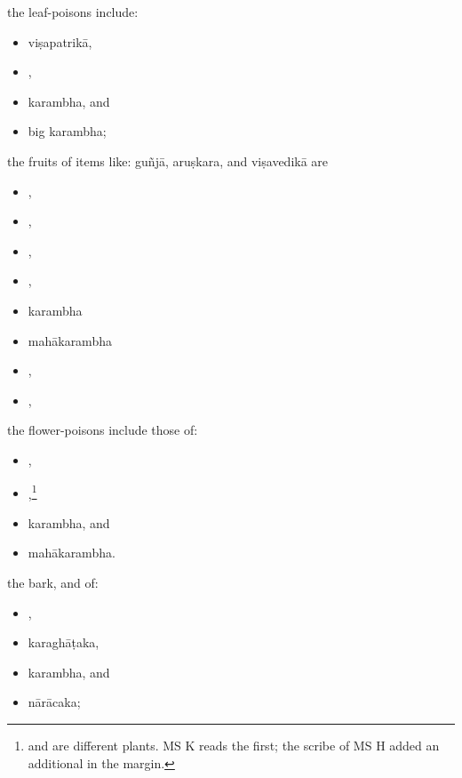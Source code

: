 \begin{translation}
    
    
        \item
        the leaf-poisons include:
             \begin{itemize}            
        \item \gls{viṣapatrikā},
        \item {},
        \item \gls{karambha},
        and
        \item big \gls{karambha};
            \end{itemize}
        \item
        the fruits of items like:
        \gls{guñjā},
        \gls{aruṣkara},
        and
        \gls{viṣavedikā}
        are
\begin{itemize}
         \item {},	
        \item {},
    \item {},
    \item {},
    \item \gls{karambha}
    \item \gls{mahākarambha}
    \item {},
    \item {},
\end{itemize}
   
        \item
        the flower-poisons include those of:
\begin{itemize}
 \item {}, 
 \item {},\footnote{ and  are 
 different plants. MS K reads the first; the scribe of MS H added an additional 
  in the margin.}
        \item \gls{karambha},
        and
        \item \gls{mahākarambha}.
\end{itemize}

        \item
        the bark,  and  of:
\begin{itemize}
        \item {},
        \item \gls{karaghāṭaka},
        \item \gls{karambha},
        and
        \item \gls{nārācaka};
            \end{itemize}
 

\end{translation}
